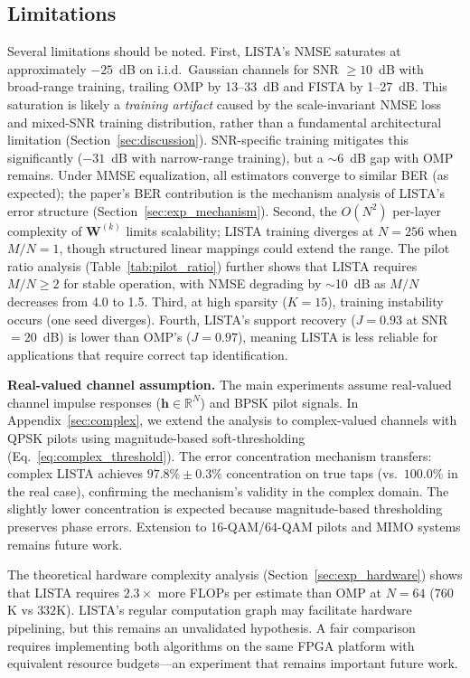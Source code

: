 \documentclass[a4paper,fleqn]{cas-sc}
\begin{document}
\subsection{Limitations}

Several limitations should be noted. First, LISTA's NMSE saturates at approximately $-25$~dB on i.i.d.~Gaussian channels for SNR $\geq 10$~dB with broad-range training, trailing OMP by 13--33~dB and FISTA by 1--27~dB. This saturation is likely a \emph{training artifact} caused by the scale-invariant NMSE loss and mixed-SNR training distribution, rather than a fundamental architectural limitation (Section~\ref{sec:discussion}). SNR-specific training mitigates this significantly ($-31$~dB with narrow-range training), but a $\sim$6~dB gap with OMP remains. Under MMSE equalization, all estimators converge to similar BER (as expected); the paper's BER contribution is the mechanism analysis of LISTA's error structure (Section~\ref{sec:exp_mechanism}). Second, the $O(N^2)$ per-layer complexity of $\mathbf{W}^{(k)}$ limits scalability; LISTA training diverges at $N=256$ when $M/N = 1$, though structured linear mappings could extend the range. The pilot ratio analysis (Table~\ref{tab:pilot_ratio}) further shows that LISTA requires $M/N \geq 2$ for stable operation, with NMSE degrading by $\sim$10~dB as $M/N$ decreases from 4.0 to 1.5. Third, at high sparsity ($K=15$), training instability occurs (one seed diverges). Fourth, LISTA's support recovery ($J = 0.93$ at SNR$=20$~dB) is lower than OMP's ($J = 0.97$), meaning LISTA is less reliable for applications that require correct tap identification.

\textbf{Real-valued channel assumption.} The main experiments assume real-valued channel impulse responses ($\mathbf{h} \in \mathbb{R}^N$) and BPSK pilot signals. In Appendix~\ref{sec:complex}, we extend the analysis to complex-valued channels with QPSK pilots using magnitude-based soft-thresholding (Eq.~\eqref{eq:complex_threshold}). The error concentration mechanism transfers: complex LISTA achieves $97.8\% \pm 0.3\%$ concentration on true taps (vs.~$100.0\%$ in the real case), confirming the mechanism's validity in the complex domain. The slightly lower concentration is expected because magnitude-based thresholding preserves phase errors. Extension to 16-QAM/64-QAM pilots and MIMO systems remains future work.

The theoretical hardware complexity analysis (Section~\ref{sec:exp_hardware}) shows that LISTA requires $2.3\times$ more FLOPs per estimate than OMP at $N=64$ ($760$K vs $332$K). LISTA's regular computation graph may facilitate hardware pipelining, but this remains an unvalidated hypothesis. A fair comparison requires implementing both algorithms on the same FPGA platform with equivalent resource budgets---an experiment that remains important future work.
\end{document}
